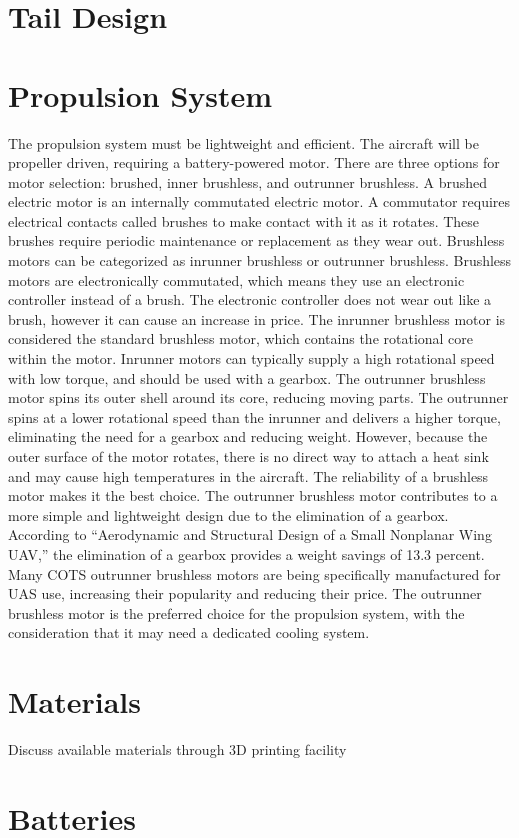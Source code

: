 \documentclass[]{article}
\begin{document}
\section{Tail Design}

\section{Propulsion System}
The propulsion system must be lightweight and efficient. The aircraft will be propeller driven, requiring a battery-powered motor. There are three options for motor selection: brushed, inner brushless, and outrunner brushless.
A brushed electric motor is an internally commutated electric motor. A commutator requires electrical contacts called brushes to make contact with it as it rotates. These brushes require periodic maintenance or replacement as they wear out. 
Brushless motors can be categorized as inrunner brushless or outrunner brushless. Brushless motors are electronically commutated, which means they use an electronic controller instead of a brush. The electronic controller does not wear out like a brush, however it can cause an increase in price. The inrunner brushless motor is considered the standard brushless motor, which contains the rotational core within the motor. Inrunner motors can typically supply a high rotational speed with low torque, and should be used with a gearbox. The outrunner brushless motor spins its outer shell around its core, reducing moving parts. The outrunner spins at a lower rotational speed than the inrunner and delivers a higher torque, eliminating the need for a gearbox and reducing weight. However, because the outer surface of the motor rotates, there is no direct way to attach a heat sink and may cause high temperatures in the aircraft. 
The reliability of a brushless motor makes it the best choice. The outrunner brushless motor contributes to a more simple and lightweight design due to the elimination of a gearbox. According to “Aerodynamic and Structural Design of a Small Nonplanar Wing UAV,” the elimination of a gearbox provides a weight savings of 13.3 percent. Many COTS outrunner brushless motors are being specifically manufactured for UAS use, increasing their popularity and reducing their price. The outrunner brushless motor is the preferred choice for the propulsion system, with the consideration that it may need a dedicated cooling system.

\section{Materials}
Discuss available materials through 3D printing facility

\section{Batteries}





\end{document}
